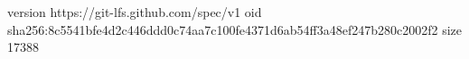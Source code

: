 version https://git-lfs.github.com/spec/v1
oid sha256:8c5541bfe4d2c446ddd0c74aa7c100fe4371d6ab54ff3a48ef247b280c2002f2
size 17388
